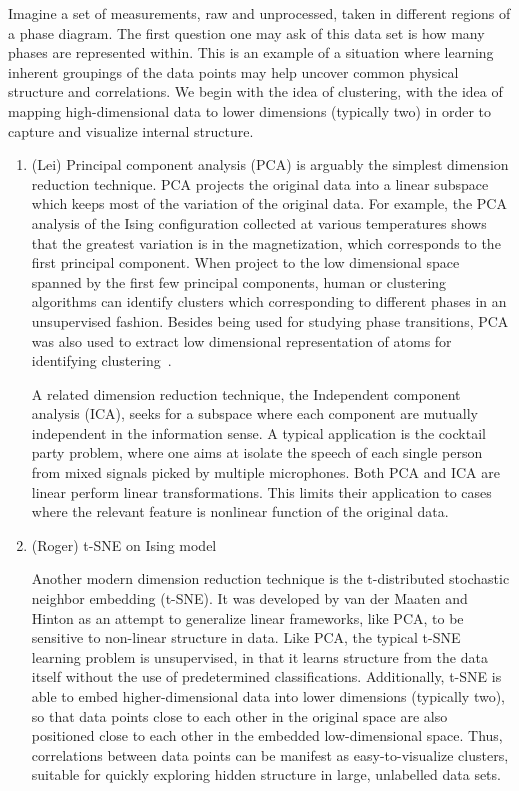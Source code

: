\documentclass[aps,prb,floatfix,amsmath,amssymb,amsfonts,10pt,floatfix,longbibliography]{revtex4-1}
\begin{document}
Imagine a set of measurements, raw and unprocessed, taken in different regions of a phase diagram.  The first question one may ask of this data set is how many phases are represented within.  This is an example of a situation where learning inherent groupings of the data points may help uncover common physical structure and correlations.  We begin with the idea of clustering, with the idea of mapping high-dimensional data to lower dimensions (typically two) in order to capture and visualize internal structure.
\begin{enumerate}
\item (Lei) Principal component analysis (PCA) is arguably the simplest dimension reduction technique. PCA projects the original data into a linear subspace which keeps most of the variation of the original data. For example, the PCA analysis of the Ising configuration collected at various temperatures shows that the greatest variation is in the magnetization, which corresponds to the first principal component. When project to the low dimensional space spanned by the first few principal components, human or clustering algorithms can identify clusters which corresponding to different phases in an unsupervised fashion. Besides being used for studying phase transitions, PCA was also used to extract low dimensional representation of atoms for identifying clustering~\cite{Atom2Vec2018}. 

A related dimension reduction technique, the Independent component analysis (ICA), seeks for a subspace where each component are mutually independent in the information sense. A typical application is the cocktail party problem, where one aims at isolate the speech of each single person from  mixed signals picked by multiple microphones. 
Both PCA and ICA are linear perform linear transformations. This limits their application to cases where the relevant feature is nonlinear function of the original data. 

\item (Roger) t-SNE on Ising model \cite{Carrasquilla2017a}

Another modern dimension reduction technique is the t-distributed stochastic neighbor embedding (t-SNE).  It was developed by van der Maaten and Hinton as an attempt to generalize linear frameworks, like PCA, to be sensitive to non-linear structure in data. Like PCA, the typical t-SNE learning problem is unsupervised, in that it learns structure from the data itself without the use of predetermined classifications.  Additionally, t-SNE is able to embed higher-dimensional data into lower dimensions (typically two), 
so that data points close to each other in the original space are also positioned close to each other in the embedded low-dimensional space.  Thus, correlations between data points can be manifest as easy-to-visualize clusters, suitable for quickly exploring hidden structure in large, unlabelled data sets.



\end{enumerate}
\end{document}
